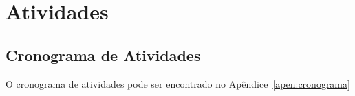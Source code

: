 
\section{Atividades}
    \label{sec:atividades}
    
    \subsection{Cronograma de Atividades}
        \label{subsec:cronograma-atividades}
        
        O cronograma de atividades pode ser encontrado no Apêndice~\ref{apen:cronograma}